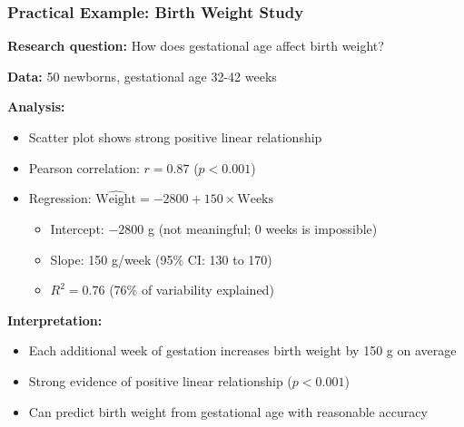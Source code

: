 \documentclass{beamer}
\begin{document}
\begin{frame}
\frametitle{Practical Example: Birth Weight Study}
\textbf{Research question:} How does gestational age affect birth weight?

\vspace{0.3cm}
\textbf{Data:} 50 newborns, gestational age 32-42 weeks

\vspace{0.3cm}
\textbf{Analysis:}
\begin{itemize}
\item Scatter plot shows strong positive linear relationship
\item Pearson correlation: $r = 0.87$ ($p < 0.001$)
\item Regression: $\widehat{\text{Weight}} = -2800 + 150 \times \text{Weeks}$
  \begin{itemize}
  \item Intercept: $-2800$ g (not meaningful; 0 weeks is impossible)
  \item Slope: 150 g/week (95\% CI: 130 to 170)
  \item $R^2 = 0.76$ (76\% of variability explained)
  \end{itemize}
\end{itemize}

\vspace{0.3cm}
\textbf{Interpretation:}
\begin{itemize}
\item Each additional week of gestation increases birth weight by 150 g on average
\item Strong evidence of positive linear relationship ($p < 0.001$)
\item Can predict birth weight from gestational age with reasonable accuracy
\end{itemize}
\end{frame}
\end{document}
